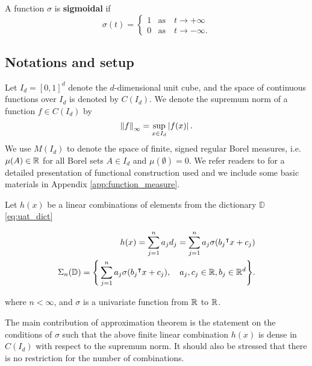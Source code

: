 
\begin{definition}\label{def:sigmoidal}
    A function $\sigma$ is \textbf{sigmoidal} if
    \begin{equation}
        \sigma(t) =
        \begin{cases}
            1 & \text{as} \quad t \to +\infty \\
            0 & \text{as} \quad t \to -\infty.
        \end{cases}
    \end{equation}
\end{definition}

\subsection*{Notations and setup}

Let $I_d = [0,1]^d$ denote the $d$-dimensional unit cube, and the space of
continuous functions over $I_d$ is denoted by $C(I_d)$. We denote the supremum
norm of a function $f \in C(I_d)$ by
\begin{equation}
    \label{def:sup_norm}
    \left\| f \right\|_{\infty} = \sup_{x\in I_d} \left| f(x) \right|.
\end{equation}
We use $M(I_d)$ to denote the space of finite, signed regular Borel measures,
i.e. $\mu(A) \in \mathbb{R}$ for all Borel sets $A \in I_d$ and $\mu(\emptyset)= 0$. We
refer readers to \cite{rudinFunctionalAnalysis1991,
rudinRealComplexAnalysis1987} for a detailed presentation of functional
construction used and we include some basic materials in Appendix
\ref{app:function_measure}.

Let $h(x)$ be a linear combinations of elements from the dictionary $\mathbb{D}$
\eqref{eq:uat_dict}

\begin{align}
    \label{eq:sum_sigma}
    h(x) = \sum_{j=1}^n a_j d_j = \sum_{j=1}^n a_j \sigma(b_j{}^{\intercal} x + c_j) \\
    \Sigma_n(\mathbb{D}) = \Bigg\{
        \sum_{j=1}^n a_j \sigma(b_j{}^{\intercal} x + c_j), \quad
        a_j, c_j \in \mathbb{R},  b_j \in \mathbb{R}^d
    \Bigg\}.
\end{align}

where  $n < \infty$, and $\sigma$ is a univariate function from $\mathbb{R}$ to $\mathbb{R}$.
 
The main contribution of approximation theorem is the statement on the
conditions of $\sigma$ such that the above finite linear combination $h(x)$ is
dense in $C(I_d)$ with respect to the supremum norm. It should also be stressed
that there is no restriction for the number of combinations.

